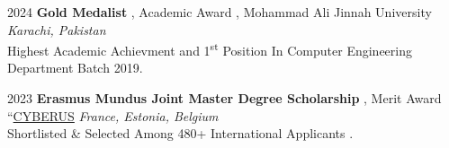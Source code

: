 

\begin{rSection}{}
  {\hspace{-0.5em}2024\hspace{1em}}{\bodyfont\bfseries\color{darktext} {Gold Medalist}}{ , Academic Award , Mohammad Ali Jinnah University
  } \hfill{\bodyfont\slshape\color{awesome} {Karachi, Pakistan}}
  \\Highest Academic Achievment and 1\textsuperscript{st} Position In Computer Engineering Department Batch 2019.
  \end{rSection}

  
\begin{rSection}{}
{\hspace{-0.5em}2023\hspace{1em}}{\bodyfont\bfseries\color{darktext} {Erasmus Mundus Joint Master Degree Scholarship}}{ , Merit Award ``\href{https://master-cyberus.eu/programme/overview}{CYBERUS}
} \hfill{\bodyfont\slshape\color{awesome} {France, Estonia, Belgium}}
\\Shortlisted \& Selected Among 480+ International Applicants .
\end{rSection}

